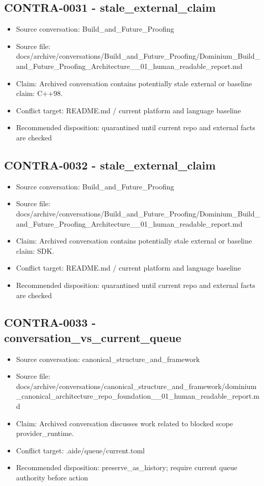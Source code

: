 \documentclass[11pt,a4paper]{report}
\begin{document}
\subsection{CONTRA-0031 - stale\_external\_claim}

\begin{itemize}
\item Source conversation: Build\_and\_Future\_Proofing
\item Source file: docs/archive/conversations/Build\_and\_Future\_Proofing/Dominium\_Build\_and\_Future\_Proofing\_Architecture\_\_01\_human\_readable\_report.md
\item Claim: Archived conversation contains potentially stale external or baseline claim: C++98.
\item Conflict target: README.md / current platform and language baseline
\item Recommended disposition: quarantined until current repo and external facts are checked
\end{itemize}

\subsection{CONTRA-0032 - stale\_external\_claim}

\begin{itemize}
\item Source conversation: Build\_and\_Future\_Proofing
\item Source file: docs/archive/conversations/Build\_and\_Future\_Proofing/Dominium\_Build\_and\_Future\_Proofing\_Architecture\_\_01\_human\_readable\_report.md
\item Claim: Archived conversation contains potentially stale external or baseline claim: SDK.
\item Conflict target: README.md / current platform and language baseline
\item Recommended disposition: quarantined until current repo and external facts are checked
\end{itemize}

\subsection{CONTRA-0033 - conversation\_vs\_current\_queue}

\begin{itemize}
\item Source conversation: canonical\_structure\_and\_framework
\item Source file: docs/archive/conversations/canonical\_structure\_and\_framework/dominium\_canonical\_architecture\_repo\_foundation\_\_01\_human\_readable\_report.md
\item Claim: Archived conversation discusses work related to blocked scope provider\_runtime.
\item Conflict target: .aide/queue/current.toml
\item Recommended disposition: preserve\_as\_history; require current queue authority before action
\end{itemize}
\end{document}
